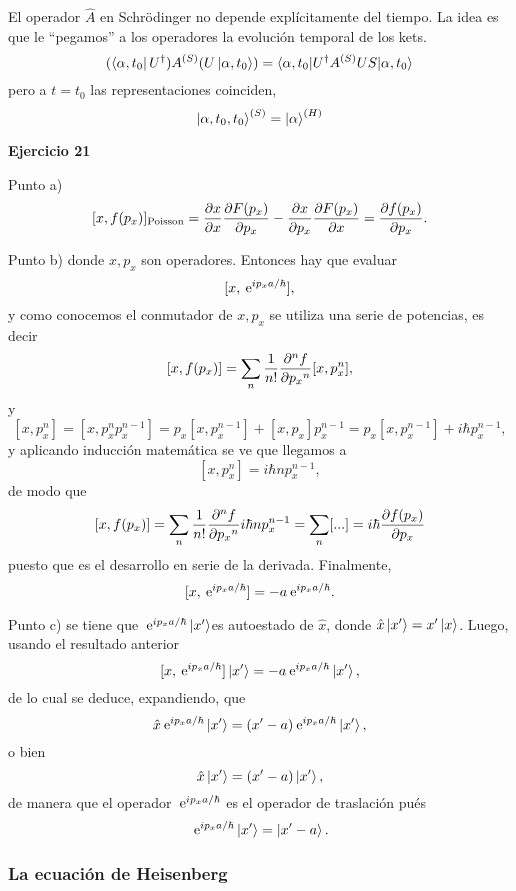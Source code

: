 \documentclass[10pt,oneside]{CBFT_book}
\begin{document}
El operador $\hat{A}$ en Schrödinger no depende explícitamente del tiempo. La idea es que le ``pegamos'' a los 
operadores la evolución temporal de los kets.
\[
	(\Bra{ \alpha, t_0 } U^\dagger) A^{(S)} (U \Ket{\alpha, t_0 }) = 
	\braket{ \alpha, t_0 | U^\dagger A^{(S)} US | \alpha, t_0 }
\]
pero a $t=t_0$ las representaciones coinciden,
\[
	\Ket{\alpha,t_0,t_0}^{(S)} = \Ket{\alpha}^{(H)}
\]

\begin{ejemplo}{\bf Ejercicio 21}

Punto a)
\[
	[x,f(p_x)]_{\text{Poisson}} = \dpar{x}{x} \dpar{F(p_x)}{p_x} - \dpar{x}{p_x} \dpar{F(p_x)}{x}
	= \dpar{f(p_x)}{p_x}.
\]

Punto b) donde $x, p_x$ son operadores. Entonces hay que evaluar
\[
	[x,\euler^{i p_x a / \hbar} ] ,
\]
y como conocemos el conmutador de $x, p_x$ se utiliza una serie de potencias, es decir
\[
	[x,f(p_x)] = \sum_n \frac{1}{n!} \dpar[n]{f}{p_x}[x,p_x^n],
\]
y
\[
	[x,p_x^n] = [x,p_x^n p_x^{n-1}] = p_x [x,p_x^{n-1}] + [x,p_x] p_x^{n-1} =
	p_x [x,p_x^{n-1}] + i \hbar p_x^{n-1},
\]
y aplicando inducción matemática se ve que llegamos a
\[
	[x,p_x^n] = i \hbar n p_x^{n-1},
\]
de modo que
\[
	[x,f(p_x)] = \sum_n \frac{1}{n!} \dpar[n]{f}{p_x} i \hbar n p_x^{n-1} =
	\sum_n [...] = i \hbar \dpar{f(p_x)}{p_x}
\]
puesto que es el desarrollo en serie de la derivada. Finalmente,
\[
	[ x, \euler^{i p_x a / \hbar} ] = - a \euler^{ i p_x a / \hbar }.
\]

Punto c) se tiene que $\euler^{ i p_x a /\hbar} \Ket{x'} $es autoestado de $\hat{x}$, donde
$ \hat{x} \Ket{x'} = x' \Ket{x}$. Luego, usando el resultado anterior
\[
	[ x, \euler^{i p_x a / \hbar} ] \Ket{x'} = - a \euler^{ i p_x a / \hbar } \Ket{x'},
\]
de lo cual se deduce, expandiendo, que
\[
	\hat{x} \euler^{i p_x a / \hbar} \Ket{x'} = (x'-a) \euler^{i p_x a / \hbar} \Ket{x'},
\]
o bien
\[
	\hat{x} \Ket{x'} = (x'-a) \Ket{x'},
\]
de manera que el operador $\euler^{i p_x a / \hbar}$ es el operador de traslación pués
\[
	\euler^{i p_x a / \hbar} \Ket{x'} = \Ket{ x'- a }.
\]
 
\end{ejemplo}


\subsubsection{La ecuación de Heisenberg}
\end{document}
